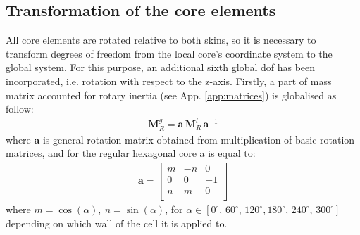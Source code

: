 \documentclass[materials,article,submit,moreauthors,pdftex]{Definitions/mdpi}
\begin{document}
\subsection{Transformation of the core elements}
\label{sec:transformation}
All core elements are rotated relative to both skins, so it is necessary to transform degrees of freedom from the local core's coordinate system to the global system.
For this purpose, an additional sixth global dof has been incorporated, i.e. rotation with respect to the z-axis.
Firstly, a part of mass matrix accounted for rotary inertia (see App. \ref{app:matrices}) is globalised as follow:
\begin{eqnarray}
\textbf{M}_R^g=\textbf{a}\,\textbf{M}_R^l\,\textbf{a}^{-1}
\label{eq:inertia}
\end{eqnarray}
where \(\textbf{a}\) is general rotation matrix obtained from multiplication of basic rotation matrices, and for the regular hexagonal core a is equal to:
\begin{eqnarray}
\textbf{a}=\left [ 
\begin{array}{ccc}
m & -n & 0\\
0 & 0 & -1\\
n & m & 0\\
\end{array}
\right ]
\label{eq:rotation}
\end{eqnarray}
where \(m=\cos(\alpha),\:n=\sin(\alpha)\), for \(\alpha\in{[0^\circ,\,60^\circ,\,120^\circ,180^\circ,\,240^\circ,\,300^\circ]}\) depending on which wall of the cell it is applied to.
\end{document}
